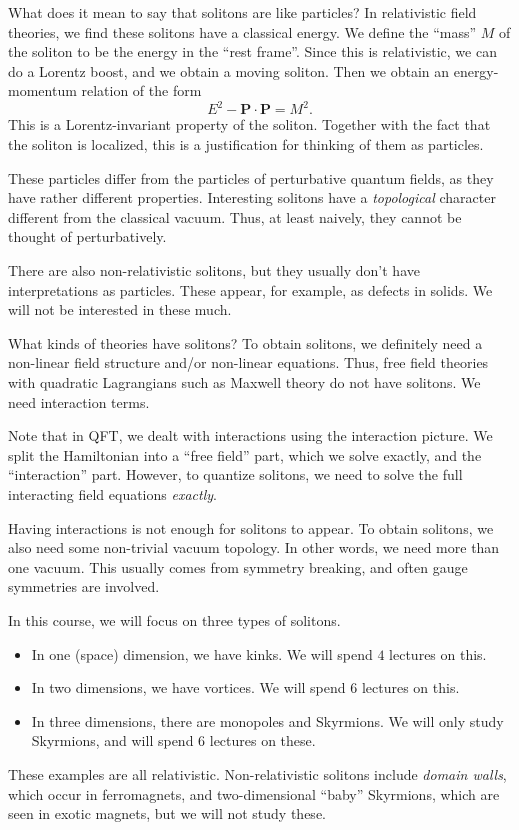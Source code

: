 \documentclass[a4paper]{article}
\begin{document}
What does it mean to say that solitons are like particles? In relativistic field theories, we find these solitons have a classical energy. We define the ``mass'' $M$ of the soliton to be the energy in the ``rest frame''. Since this is relativistic, we can do a Lorentz boost, and we obtain a moving soliton. Then we obtain an energy-momentum relation of the form
\[
  E^2 - \mathbf{P} \cdot \mathbf{P} = M^2.
\]
This is a Lorentz-invariant property of the soliton. Together with the fact that the soliton is localized, this is a justification for thinking of them as particles.

These particles differ from the particles of perturbative quantum fields, as they have rather different properties. Interesting solitons have a \emph{topological} character different from the classical vacuum. Thus, at least naively, they cannot be thought of perturbatively.

There are also non-relativistic solitons, but they usually don't have interpretations as particles. These appear, for example, as defects in solids. We will not be interested in these much.

What kinds of theories have solitons? To obtain solitons, we definitely need a non-linear field structure and/or non-linear equations. Thus, free field theories with quadratic Lagrangians such as Maxwell theory do not have solitons. We need interaction terms.

Note that in QFT, we dealt with interactions using the interaction picture. We split the Hamiltonian into a ``free field'' part, which we solve exactly, and the ``interaction'' part. However, to quantize solitons, we need to solve the full interacting field equations \emph{exactly}.

Having interactions is not enough for solitons to appear. To obtain solitons, we also need some non-trivial vacuum topology. In other words, we need more than one vacuum. This usually comes from symmetry breaking, and often gauge symmetries are involved.

In this course, we will focus on three types of solitons.
\begin{itemize}
  \item In one (space) dimension, we have kinks. We will spend $4$ lectures on this.

  \item In two dimensions, we have vortices. We will spend $6$ lectures on this.

  \item In three dimensions, there are monopoles and Skyrmions. We will only study Skyrmions, and will spend $6$ lectures on these.
\end{itemize}
These examples are all relativistic. Non-relativistic solitons include \emph{domain walls}, which occur in ferromagnets, and two-dimensional ``baby'' Skyrmions, which are seen in exotic magnets, but we will not study these.
\end{document}
